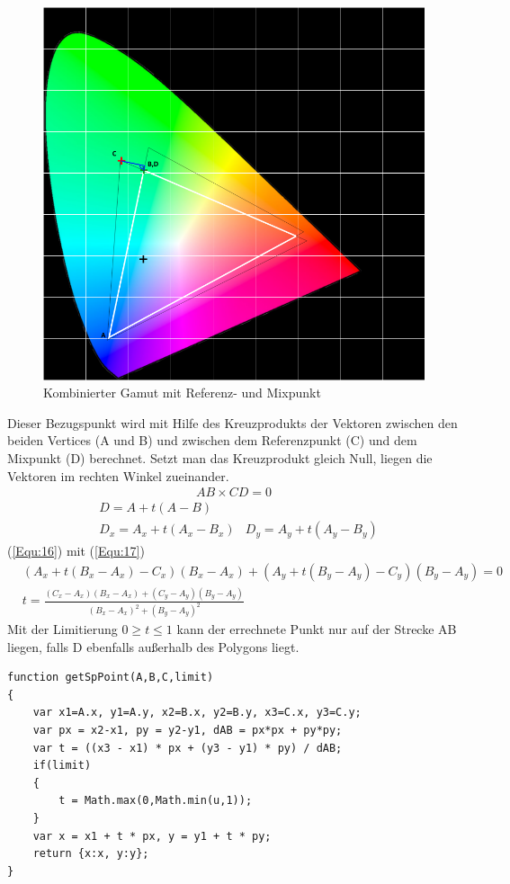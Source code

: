 \documentclass[11pt]{scrartcl}
\begin{document}
\begin{figure}[H]
    \begin{center}
        \includegraphics[width=.7\textwidth]{images/combined_gamut_with_mix_point_and_math.png} %
    \end{center}
    \caption{Kombinierter Gamut mit Referenz- und Mixpunkt}\label{fig:refCombined}
\end{figure}
\noindent
Dieser Bezugspunkt wird mit Hilfe des Kreuzprodukts der Vektoren zwischen den beiden Vertices (A und B) und zwischen dem Referenzpunkt (C)
und dem Mixpunkt (D) berechnet. Setzt man das Kreuzprodukt gleich Null, liegen die Vektoren im rechten Winkel zueinander.
\begin{align}\label{Equ:16}
    AB \times CD = 0
\end{align}
\begin{align}\label{Equ:17}
    &D = A + t(A - B)\\
    &D_x = A_x + t(A_x - B_x)
    &D_y = A_y + t(A_y - B_y)
\end{align}
(\ref{Equ:16}) mit (\ref{Equ:17})
\begin{align}\label{Equ:18}
    &(A_x+t(B_x-A_x)-C_x)(B_x-A_x)+(A_y+t(B_y-A_y)-C_y)(B_y-A_y)=0\\
    &t = \frac{(C_x-A_x)(B_x-A_x)+(C_y-A_y)(B_y-A_y)}{(B_x-A_x)^2+(B_y-A_y)^2}
\end{align}
Mit der Limitierung $0 \geq t \leq 1$ kann der errechnete Punkt nur auf der Strecke AB liegen, falls D ebenfalls außerhalb des Polygons liegt.\\
\begin{lstlisting}[caption=Mixpunktermittlung]
function getSpPoint(A,B,C,limit)
{
    var x1=A.x, y1=A.y, x2=B.x, y2=B.y, x3=C.x, y3=C.y;
    var px = x2-x1, py = y2-y1, dAB = px*px + py*py;
    var t = ((x3 - x1) * px + (y3 - y1) * py) / dAB;
    if(limit)
    {
        t = Math.max(0,Math.min(u,1));
    }
    var x = x1 + t * px, y = y1 + t * py;
    return {x:x, y:y};
}
\end{lstlisting}
\end{document}
